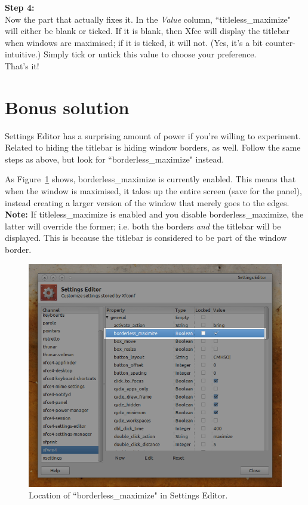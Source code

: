 \documentclass[12pt, a4paper]{article}
\begin{document}
\noindent \textbf{Step 4:}\\

\noindent Now the part that actually fixes it. In the \emph{Value} column, ``titleless\_maximize" will either be blank or ticked. If it is blank, then Xfce will display the titlebar when windows are maximised; if it is ticked, it will not. (Yes, it's a bit counter-intuitive.) Simply tick or untick this value to choose your preference.\\

\noindent That's it!

\section*{Bonus solution}

Settings Editor has a surprising amount of power if you're willing to experiment. Related to hiding the titlebar is hiding window borders, as well. Follow the same steps as above, but look for ``borderless\_maximize" instead. 

As Figure~\ref{fig6} shows, borderless\_maximize is currently enabled. This means that when the window is maximised, it takes up the entire screen (save for the panel), instead creating a larger version of the window that merely goes to the edges. \\

\noindent \textbf{Note:} If titleless\_maximize is enabled and you disable borderless\_maximize, the latter will override the former; i.e. both the borders \emph{and} the titlebar will be displayed. This is because the titlebar is considered to be part of the window border.

\begin{figure}[h]
  \centering
  \includegraphics[width=1\textwidth]{imgs/6borderlessmaximise.png}
  \caption{Location of ``borderless\_maximize" in Settings Editor.}
  \label{fig6}
\end{figure}
\end{document}
